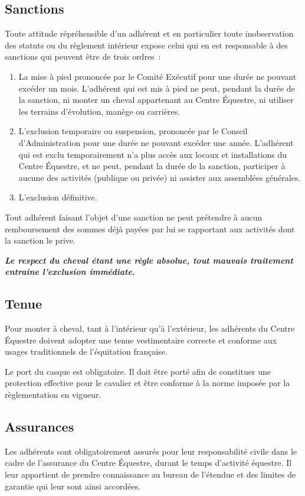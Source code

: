 \documentclass[11pt,a4paper]{article}
\begin{document}
\subsection{Sanctions}\label{subsec:sanctions}
Toute attitude répréhensible d'un adhérent et en particulier toute inobservation des statuts ou du règlement intérieur expose celui qui en est responsable à des sanctions qui peuvent être de trois ordres~:
\begin{enumerate}
\item
La mise à pied prononcée par le Comité Exécutif pour une durée ne pouvant excéder un mois.
L'adhérent qui est mis à pied ne peut, pendant la durée de la sanction, ni monter un cheval appartenant au Centre Équestre, ni utiliser les terrains d'évolution, manège ou carrières.
\item
L'exclusion temporaire ou suspension, prononcée par le Conseil d'Administration pour une durée ne pouvant excéder une année.
L'adhérent qui est exclu temporairement n'a plus accès aux locaux et installations du Centre Équestre, et ne peut, pendant la durée de la sanction, participer à aucune des activités (publique ou privée) ni assister aux assemblées générales.
\item
L'exclusion définitive.
\end{enumerate}
Tout adhérent faisant l'objet d'une sanction ne peut prétendre à aucun remboursement des sommes déjà payées par lui se rapportant aux activités dont la sanction le prive.

\textit{\textbf{Le respect du cheval étant une règle absolue, tout mauvais traitement entraîne l'exclusion immédiate.}}

\subsection{Tenue}\label{subsec:tenue}
Pour monter à cheval, tant à l'intérieur qu'à l'extérieur, les adhérents du Centre Équestre doivent adopter une tenue vestimentaire correcte et conforme aux usages traditionnels de l'équitation française.

Le port du casque est obligatoire.
Il doit être porté afin de constituer une protection effective pour le cavalier et être conforme à la norme imposée par la règlementation en vigueur.

\subsection{Assurances}\label{subsec:assurances}
Les adhérents sont obligatoirement assurés pour leur responsabilité civile dans le cadre de l'assurance du Centre Équestre, durant le temps d'activité équestre.
Il leur appartient de prendre connaissance au bureau de l'étendue et des limites de garantie qui leur sont ainsi accordées.
\end{document}
